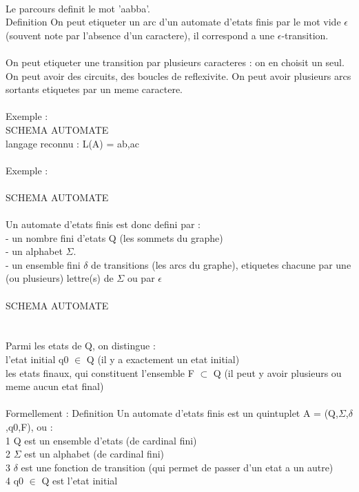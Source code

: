 \documentclass[5pt]{article}
\begin{document}
\begin{scriptsize}
\\
Le parcours definit le mot ’aabba’.
\\
Definition On peut etiqueter un arc d’un automate d’etats finis par le mot vide $\epsilon$ (souvent note par l’absence d’un caractere), il correspond a une $\epsilon$-transition.\\
\\
On peut etiqueter une transition par plusieurs caracteres : on en choisit un seul. On peut avoir des circuits, des boucles de reflexivite. On peut avoir plusieurs arcs sortants etiquetes par un meme caractere.\\
\\
Exemple :
\\
SCHEMA AUTOMATE\\
langage reconnu : L(A) = {ab,ac}\\
\\
Exemple :\\
\\
SCHEMA AUTOMATE\\
\\
Un automate d’etats finis est donc defini par :\\
- un nombre fini d’etats Q (les sommets du graphe)\\
- un alphabet $\Sigma$.\\
- un ensemble fini $\delta$ de transitions (les arcs du graphe), etiquetes chacune par une (ou plusieurs) lettre(s) de $\Sigma$ ou par $\epsilon$\\
\\
SCHEMA AUTOMATE\\
\\
\\
Parmi les etats de Q, on distingue :\\
l’etat initial q0 $\in$ Q (il y a exactement un etat initial)\\
les etats finaux, qui constituent l’ensemble F $\subset$ Q (il peut y avoir plusieurs ou meme aucun etat final)\\
\\
Formellement : Definition Un automate d’etats finis est un quintuplet A = (Q,$\Sigma$,$\delta$,q0,F), ou :\\
1 Q est un ensemble d’etats (de cardinal fini)\\
2 $\Sigma$ est un alphabet (de cardinal fini)\\
3 $\delta$ est une fonction de transition (qui permet de passer d’un etat a un autre)\\
4 q0 $\in$ Q est l’etat initial\\

\end{scriptsize}
\end{document}

